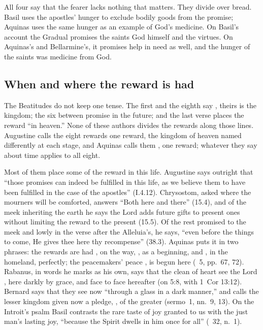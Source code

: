 All four say that the fearer lacks nothing that matters. They divide over
bread. Basil uses the apostles' hunger to exclude bodily goods from the
promise; Aquinas uses the same hunger as an example of God's medicine. On
Basil's account the Gradual promises the saints God himself and the virtues.
On Aquinas's and Bellarmine's, it promises help in need as well, and
the hunger of the saints was medicine from God.

\subsection{When and where the reward is had}

The Beatitudes do not keep one tense. The first and the eighth say
, theirs is the kingdom; the six between
promise in the future; and the last verse places the reward ``in heaven.''
None of these authors divides the rewards along those lines. Augustine calls
the eight rewards one reward, the kingdom of heaven named differently at each
stage, and Aquinas calls them , one reward; whatever
they say about time applies to all eight.

Most of them place some of the reward in this life. Augustine says outright
that ``those promises can indeed be fulfilled in this life, as we believe them
to have been fulfilled in the case of the apostles'' (I.4.12). Chrysostom,
asked where the mourners will be comforted, answers ``Both here and there''
(15.4), and of the meek inheriting the earth he says the Lord adds future
gifts to present ones without limiting the reward to the present (15.5). Of
the rest promised to the meek and lowly in the verse after the Alleluia's, he
says, ``even before the things to come, He gives thee here thy recompense''
(38.3). Aquinas puts it in two
phrases: the rewards are had , on the way, , as a beginning, and , in the homeland,
perfectly; the peacemakers' peace , is begun here
(\ 5, pp.~67, 72). Rabanus, in words he marks as his own,
says that the clean of heart see the Lord , here darkly by grace, and face to face hereafter (on 5:8, with
1~Cor 13:12). Bernard says that they see now ``through a glass in a dark
manner,'' and calls the lesser kingdom given now a pledge, , of the greater (sermo~1, nn.~9, 13). On the Introit's psalm Basil
contrasts the rare taste of joy granted to us with the just man's lasting
joy, ``because the Spirit dwells in him once for all'' (\
32, n.~1).

